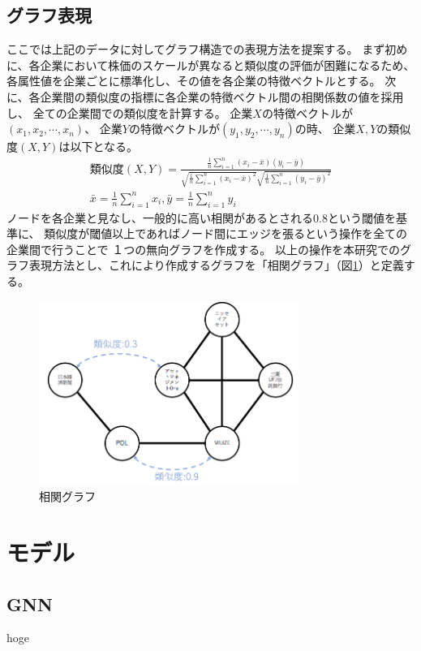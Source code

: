 \documentclass[twocolumn,10.5pt]{article}           %
\begin{document}
\subsection{グラフ表現}
ここでは上記のデータに対してグラフ構造での表現方法を提案する。
まず初めに、各企業において株価のスケールが異なると類似度の評価が困難になるため、
各属性値を企業ごとに標準化し、その値を各企業の特徴ベクトルとする。
次に、各企業間の類似度の指標に各企業の特徴ベクトル間の相関係数の値を採用し、
全ての企業間での類似度を計算する。
企業$X$の特徴ベクトルが$(x_1, x_2, \cdots, x_n)$、
企業$Y$の特徴ベクトルが$(y_1, y_2, \cdots, y_n)$の時、
企業$X, Y$の類似度$(X, Y)$は以下となる。
\begin{eqnarray}
	\mbox{類似度}(X, Y) = \frac{\frac{1}{n}\sum_{i=1}^{n}(x_i - \bar{x})(y_i - \bar{y})}{\sqrt{\frac{1}{n}\sum_{i=1}^{n}(x_i - \bar{x})^2}\sqrt{\frac{1}{n}\sum_{i=1}^{n}(y_i - \bar{y})^2}}\\
	\bar{x} = \frac{1}{n}\sum_{i=1}^{n}x_i, \bar{y} = \frac{1}{n}\sum_{i=1}^{n}y_i \nonumber
\end{eqnarray}
ノードを各企業と見なし、一般的に高い相関があるとされる0.8という閾値を基準に、
類似度が閾値以上であればノード間にエッジを張るという操作を全ての企業間で行うことで
１つの無向グラフを作成する。
以上の操作を本研究でのグラフ表現方法とし、これにより作成するグラフを「相関グラフ」（図\ref{graph}）と定義する。
\begin{figure}[h]
	\centering
	\includegraphics[width=85mm]{img/graph.png}
	\caption{相関グラフ}
	\label{graph}
\end{figure}

\section{モデル}
\subsection{GNN}
hoge
\end{document}

